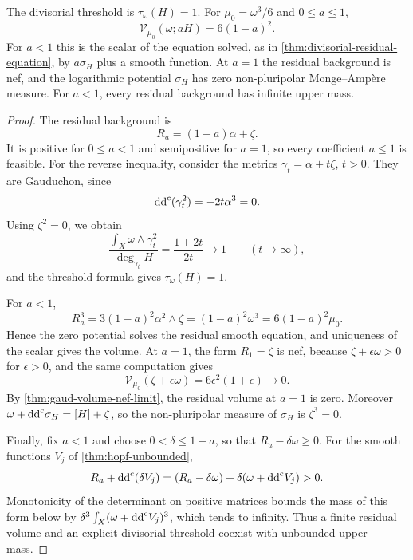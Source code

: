 \begin{proposition}\label{prop:hopf-divisorial-threshold}
The divisorial threshold is $\tau_\omega(H)=1$. For $\mu_0=\omega^3/6$ and $0\leq a\leq1$,
\[
 \mathcal V_{\mu_0}(\omega;aH)=6(1-a)^2.
\]
For $a<1$ this is the scalar of the equation solved, as in \cref{thm:divisorial-residual-equation}, by $a\sigma_H$ plus a smooth function. At $a=1$ the residual background is nef, and the logarithmic potential $\sigma_H$ has zero non-pluripolar Monge--Amp\`ere measure. For $a<1$, every residual background has infinite upper mass.
\end{proposition}
\begin{proof}
The residual background is
\[
 R_a=(1-a)\alpha+\zeta.
\]
It is positive for $0\leq a<1$ and semipositive for $a=1$, so every coefficient $a\leq1$ is feasible. For the reverse inequality, consider the metrics $\gamma_t=\alpha+t\zeta$, $t>0$. They are Gauduchon, since
\[
 \mathrm{dd}^{\mathrm{c}}(\gamma_t^2)=-2t\alpha^3=0.
\]
Using $\zeta^2=0$, we obtain
\[
 \frac{\int_X\omega\wedge\gamma_t^2}{\deg_{\gamma_t}H}
       =\frac{1+2t}{2t}\longrightarrow1\qquad(t\to\infty),
\]
and the threshold formula gives $\tau_\omega(H)=1$.

For $a<1$,
\[
 R_a^3=3(1-a)^2\alpha^2\wedge\zeta
       =(1-a)^2\omega^3=6(1-a)^2\mu_0.
\]
Hence the zero potential solves the residual smooth equation, and uniqueness of the scalar gives the volume. At $a=1$, the form $R_1=\zeta$ is nef, because $\zeta+\epsilon\omega>0$ for $\epsilon>0$, and the same computation gives
\[
 \mathcal V_{\mu_0}(\zeta+\epsilon\omega)
       =6\epsilon^2(1+\epsilon)\longrightarrow0.
\]
By \cref{thm:gaud-volume-nef-limit}, the residual volume at $a=1$ is zero. Moreover $\omega+\mathrm{dd}^{\mathrm{c}}\sigma_H=[H]+\zeta$, so the non-pluripolar measure of $\sigma_H$ is $\zeta^3=0$.

Finally, fix $a<1$ and choose $0<\delta\leq1-a$, so that $R_a-\delta\omega\geq0$. For the smooth functions $V_j$ of \cref{thm:hopf-unbounded},
\[
 R_a+\mathrm{dd}^{\mathrm{c}}(\delta V_j)
       =(R_a-\delta\omega)+\delta(\omega+\mathrm{dd}^{\mathrm{c}} V_j)>0.
\]
Monotonicity of the determinant on positive matrices bounds the mass of this form below by $\delta^3\int_X(\omega+\mathrm{dd}^{\mathrm{c}} V_j)^3$, which tends to infinity. Thus a finite residual volume and an explicit divisorial threshold coexist with unbounded upper mass.
\end{proof}
